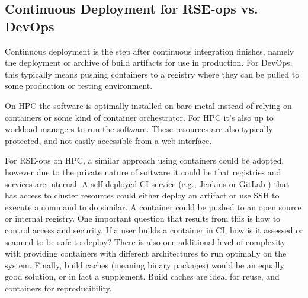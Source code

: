 \subsection{Continuous Deployment for RSE-ops vs. DevOps}

Continuous deployment is the step after continuous integration finishes, namely the deployment or archive of build artifacts for use in production. 
For DevOps, this typically means pushing containers to a registry where they can be pulled to some production or testing environment.

On HPC the software is optimally installed on bare metal instead of relying on containers or some kind of container orchestrator. For HPC it's also up to workload managers \cite{slurm,flux} to run the software. These resources are also typically protected, and not easily accessible from a web interface.

For RSE-ops on HPC, a similar approach using containers could be adopted, however due to the private nature of software it could be that registries and services are internal. A self-deployed CI service (e.g., Jenkins or GitLab \cite{jenkins,gitlab}) that has access to cluster resources could either deploy an artifact or use SSH to execute a command to do similar. A container could be pushed to an open source or internal registry. One important question that results from this is how to control access and security. If a user builds a container in CI, how is it assessed or scanned to be safe to deploy?  There is also one additional level of complexity with providing containers with different architectures to run
optimally on the system. Finally, build caches (meaning binary packages) would be an equally good solution, or in fact a supplement. Build caches are ideal for reuse, and containers for reproducibility.
